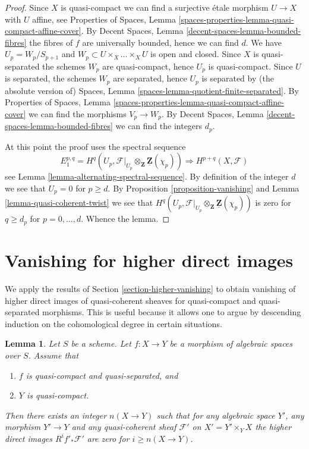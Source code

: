 \documentclass{stacks-project}
\theoremstyle{plain}
\newtheorem{lemma}[subsection]{Lemma}
\theoremstyle{definition}
\theoremstyle{remark}
\numberwithin{equation}{subsection}
\begin{document}
\begin{proof}
Since $X$ is quasi-compact we can find a surjective \'etale morphism
$U \to X$ with $U$ affine, see
Properties of Spaces, Lemma
\ref{spaces-properties-lemma-quasi-compact-affine-cover}.
By
Decent Spaces, Lemma \ref{decent-spaces-lemma-bounded-fibres}
the fibres of $f$ are universally bounded, hence we can find $d$.
We have $U_p = W_p/S_{p + 1}$ and $W_p \subset U \times_X \ldots \times_X U$
is open and closed. Since $X$ is quasi-separated the schemes
$W_p$ are quasi-compact, hence $U_p$ is quasi-compact.
Since $U$ is separated, the schemes $W_p$ are separated, hence
$U_p$ is separated by (the absolute version of)
Spaces, Lemma \ref{spaces-lemma-quotient-finite-separated}.
By
Properties of Spaces, Lemma
\ref{spaces-properties-lemma-quasi-compact-affine-cover}
we can find the morphisms $V_p \to W_p$.
By
Decent Spaces, Lemma \ref{decent-spaces-lemma-bounded-fibres}
we can find the integers $d_p$.

\medskip\noindent
At this point the proof uses the spectral sequence
$$
E_1^{p, q} =
H^q(U_p, \mathcal{F}|_{U_p} \otimes_\mathbf{Z} \underline{\mathbf{Z}}(\chi_p))
\Rightarrow
H^{p + q}(X, \mathcal{F})
$$
see
Lemma \ref{lemma-alternating-spectral-sequence}.
By definition of the integer $d$ we see that $U_p = 0$ for $p \geq d$.
By Proposition \ref{proposition-vanishing}
and
Lemma \ref{lemma-quasi-coherent-twist}
we see that
$H^q(U_p,
\mathcal{F}|_{U_p} \otimes_\mathbf{Z} \underline{\mathbf{Z}}(\chi_p))$
is zero for $q \geq d_p$ for $p = 0, \ldots, d$.
Whence the lemma.
\end{proof}









\section{Vanishing for higher direct images}
\label{section-vanishing-higher-direct-images}

\noindent
We apply the results of
Section \ref{section-higher-vanishing}
to obtain vanishing of higher direct images of quasi-coherent sheaves
for quasi-compact and quasi-separated morphisms. This is useful because
it allows one to argue by descending induction on the cohomological degree
in certain situations.

\begin{lemma}
\label{lemma-vanishing-higher-direct-images}
Let $S$ be a scheme. Let $f : X \to Y$ be a
morphism of algebraic spaces over $S$.
Assume that
\begin{enumerate}
\item $f$ is quasi-compact and quasi-separated, and
\item $Y$ is quasi-compact.
\end{enumerate}
Then there exists an integer $n(X \to Y)$ such that
for any algebraic space $Y'$, any morphism $Y' \to Y$
and any quasi-coherent sheaf $\mathcal{F}'$ on $X' = Y' \times_Y X$
the higher direct images $R^if'_*\mathcal{F}'$ are zero for
$i \geq n(X \to Y)$.
\end{lemma}
\end{document}
